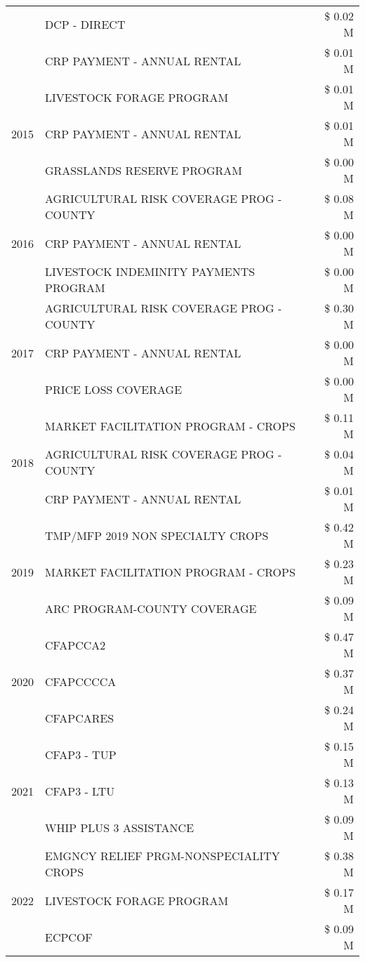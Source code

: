 \begin{tabular}{llr}
 & DCP - DIRECT & \$ 0.02 M \\
 & CRP PAYMENT - ANNUAL RENTAL & \$ 0.01 M \\
\cline{1-3}
\multirow[t]{3}{*}{2015} & LIVESTOCK FORAGE PROGRAM & \$ 0.01 M \\
 & CRP PAYMENT - ANNUAL RENTAL & \$ 0.01 M \\
 & GRASSLANDS RESERVE PROGRAM & \$ 0.00 M \\
\cline{1-3}
\multirow[t]{3}{*}{2016} & AGRICULTURAL RISK COVERAGE PROG - COUNTY & \$ 0.08 M \\
 & CRP PAYMENT - ANNUAL RENTAL & \$ 0.00 M \\
 & LIVESTOCK INDEMINITY PAYMENTS PROGRAM & \$ 0.00 M \\
\cline{1-3}
\multirow[t]{3}{*}{2017} & AGRICULTURAL RISK COVERAGE PROG - COUNTY & \$ 0.30 M \\
 & CRP PAYMENT - ANNUAL RENTAL & \$ 0.00 M \\
 & PRICE LOSS COVERAGE & \$ 0.00 M \\
\cline{1-3}
\multirow[t]{3}{*}{2018} & MARKET FACILITATION PROGRAM - CROPS & \$ 0.11 M \\
 & AGRICULTURAL RISK COVERAGE PROG - COUNTY & \$ 0.04 M \\
 & CRP PAYMENT - ANNUAL RENTAL & \$ 0.01 M \\
\cline{1-3}
\multirow[t]{3}{*}{2019} & TMP/MFP 2019 NON SPECIALTY CROPS & \$ 0.42 M \\
 & MARKET FACILITATION PROGRAM - CROPS & \$ 0.23 M \\
 & ARC PROGRAM-COUNTY COVERAGE & \$ 0.09 M \\
\cline{1-3}
\multirow[t]{3}{*}{2020} & CFAPCCA2 & \$ 0.47 M \\
 & CFAPCCCCA & \$ 0.37 M \\
 & CFAPCARES & \$ 0.24 M \\
\cline{1-3}
\multirow[t]{3}{*}{2021} & CFAP3 - TUP & \$ 0.15 M \\
 & CFAP3 - LTU & \$ 0.13 M \\
 & WHIP PLUS 3 ASSISTANCE & \$ 0.09 M \\
\cline{1-3}
\multirow[t]{3}{*}{2022} & EMGNCY RELIEF PRGM-NONSPECIALITY CROPS & \$ 0.38 M \\
 & LIVESTOCK FORAGE PROGRAM & \$ 0.17 M \\
 & ECPCOF & \$ 0.09 M \\
\cline{1-3}
\bottomrule
\end{tabular}
